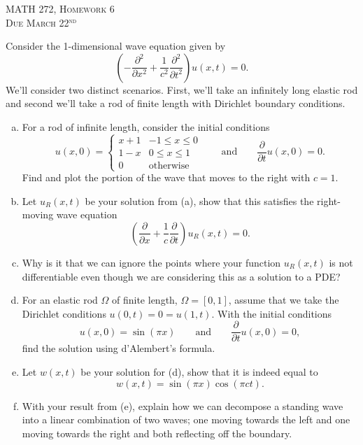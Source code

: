 \documentclass[12pt]{article} %
\begin{document}
\begin{center}
   \textsc{\large MATH 272, Homework 6}\\
   \textsc{Due March 22$^\textrm{nd}$}
\end{center}
\vspace{.5cm}

\begin{problem}
Consider the 1-dimensional wave equation given by
\[
\left(-\frac{\partial^2}{\partial x^2} +\frac{1}{c^2} \frac{\partial^2}{\partial  t^2} \right) u(x,t) = 0.
\]
We'll consider two distinct scenarios. First, we'll take an infinitely long elastic rod and second we'll take a rod of finite length with Dirichlet boundary conditions.
\begin{enumerate}[(a)]
    \item For a rod of infinite length, consider the initial conditions
    \[
    u(x,0) = \begin{cases} x+1 & -1\leq x \leq 0 \\ 1-x & 0\leq x \leq 1 \\ 0 & \textrm{otherwise} \end{cases} \qquad \textrm{and} \qquad \frac{\partial}{\partial t} u(x,0) = 0.
    \]
    Find and plot the portion of the wave that moves to the right with $c=1$.
    \item Let $u_R(x,t)$ be your solution from (a), show that this satisfies the right-moving wave equation
    \[
    \left(\frac{\partial}{\partial x} + \frac{1}{c} \frac{\partial}{\partial t} \right)u_R(x,t) = 0.
    \]
    \item Why is it that we can ignore the points where your function $u_R(x,t)$ is not differentiable even though we are considering this as a solution to a PDE?
    \item For an elastic rod $\Omega$ of finite length, $\Omega = [0,1]$, assume that we take the Dirichlet conditions $u(0,t)=0=u(1,t)$.  With the initial conditions
    \[
    u(x,0) = \sin(\pi x) \qquad \textrm{and} \qquad \frac{\partial}{\partial t} u(x,0)=0,
    \]
    find the solution using d'Alembert's formula.
    \item Let $w(x,t)$ be your solution for (d), show that it is indeed equal to
    \[
    w(x,t) = \sin(\pi x)\cos(\pi c t).
    \]
    \item With your result from (e), explain how we can decompose a standing wave into a linear combination of two waves; one moving towards the left and one moving towards the right and both reflecting off the boundary.
\end{enumerate}
\end{problem}
\end{document}
